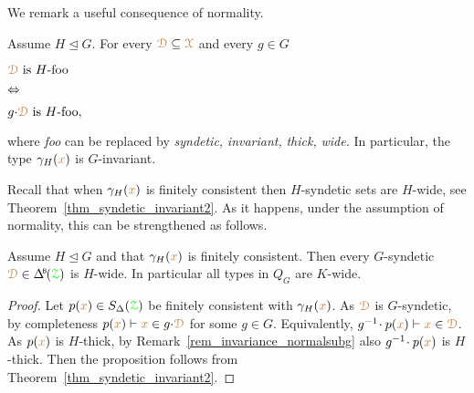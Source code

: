 We remark a useful consequence of normality.

\begin{remark}\label{rem_invariance_normalsubg}
\def\medrel#1{\parbox[t]{5ex}{$\displaystyle\hfil #1$}}
\def\ceq#1#2#3{\parbox[t]{20ex}{$\displaystyle #1$}\medrel{#2}{$\displaystyle #3$}}
  Assume $H\trianglelefteq G$.
  For every ${\color{brown}\EuScript D}\subseteq{\color{brown}\EuScript X}$ and every $g\in G$ \smallskip
  
  \ceq{\hfill\mrD\textrm{ is }H\textrm{-foo}}{\IFF}{g{\cdot}\mrD\textrm{ is }H\textrm{-foo},} \smallskip
  
  where \textit{foo\/} can be replaced by \textit{syndetic,} \textit{invariant,} \textit{thick,} \textit{wide.}
  In particular, the type $\gamma_H({\color{brown} x})$ is $G$-invariant.
\end{remark}

Recall that when $\gamma_H({\color{brown} x})$ is finitely consistent then $H$-syndetic sets are $H$-wide, see Theorem~\ref{thm_syndetic_invariant2}.
As it happens, under the assumption of normality, this can be strengthened as follows.

\begin{proposition}\label{prop_Gsyndetic_Hthick1}
  Assume $H\trianglelefteq G$ and that $\gamma_H({\color{brown} x})$ is finitely consistent.
  Then every $G$-syndetic $\mrD\in\BDelta(\grZ)$ is $H$-wide.
  In particular all types in $Q_G$ are $K$-wide.
\end{proposition}

\begin{proof}
  Let $p({\color{brown} x})\in S_\Delta({\color{green}\EuScript Z})$ be finitely consistent with $\gamma_H({\color{brown} x})$.
  As ${\color{brown}\EuScript D}$ is $G$-syndetic, by completeness $p({\color{brown} x})\vdash{\color{brown}x}\in g{\cdot}{\color{brown}\EuScript D}$ for some $g\in G$.
  Equivalently, $g^{-1}\!\cdot p({\color{brown} x})\vdash{\color{brown}x}\in{\color{brown}\EuScript D}$.
  As $p({\color{brown} x})$ is $H$-thick, by Remark~\ref{rem_invariance_normalsubg} also $g^{-1}\!\cdot p({\color{brown} x})$ is $H$-thick.
  Then the proposition follows from Theorem~\ref{thm_syndetic_invariant2}.
\end{proof}

